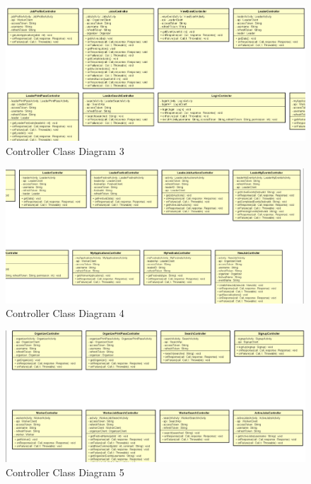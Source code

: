 			\begin{figure}[H]
				\includegraphics[width=\linewidth]{diagrams/Controllers Class Diagram_part3.png}
				\caption{Controller Class Diagram 3}
				\label{fig:controller_class_diag_pt3}
			\end{figure}
		
			\begin{figure}[H]
				\includegraphics[width=\linewidth]{diagrams/Controllers Class Diagram_part4.png}
				\caption{Controller Class Diagram 4}
				\label{fig:controller_class_diag_pt4}
			\end{figure}
		
			\begin{figure}[H]
				\includegraphics[width=\linewidth]{diagrams/Controllers Class Diagram_part5.png}
				\caption{Controller Class Diagram 5}
				\label{fig:controller_class_diag_pt5}
			\end{figure}
		
